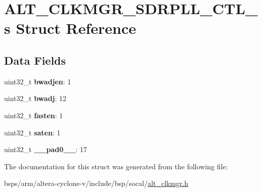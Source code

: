 \hypertarget{structALT__CLKMGR__SDRPLL__CTL__s}{}\section{A\+L\+T\+\_\+\+C\+L\+K\+M\+G\+R\+\_\+\+S\+D\+R\+P\+L\+L\+\_\+\+C\+T\+L\+\_\+s Struct Reference}
\label{structALT__CLKMGR__SDRPLL__CTL__s}
\subsection*{Data Fields}
\begin{DoxyCompactItemize}
\item 
\mbox{\label{structALT__CLKMGR__SDRPLL__CTL__s_a0541a393c3399e71964833f2bcc9ddbb}} 
uint32\+\_\+t {\bfseries bwadjen}\+: 1
\item 
\mbox{\label{structALT__CLKMGR__SDRPLL__CTL__s_a5ded9005fda7fdf5543508f38ec65faa}} 
uint32\+\_\+t {\bfseries bwadj}\+: 12
\item 
\mbox{\label{structALT__CLKMGR__SDRPLL__CTL__s_ab4cda27e1ea1056d17760589164681d6}} 
uint32\+\_\+t {\bfseries fasten}\+: 1
\item 
\mbox{\label{structALT__CLKMGR__SDRPLL__CTL__s_a67f51297f7eb58a27e530ebceaf6787e}} 
uint32\+\_\+t {\bfseries saten}\+: 1
\item 
\mbox{\label{structALT__CLKMGR__SDRPLL__CTL__s_a6e49ebeeceaf7006d70f3574c4a55d60}} 
uint32\+\_\+t {\bfseries \+\_\+\+\_\+pad0\+\_\+\+\_\+}\+: 17
\end{DoxyCompactItemize}


The documentation for this struct was generated from the following file\+:\begin{DoxyCompactItemize}
\item 
bsps/arm/altera-\/cyclone-\/v/include/bsp/socal/\mbox{\hyperlink{alt__clkmgr_8h}{alt\+\_\+clkmgr.\+h}}\end{DoxyCompactItemize}
